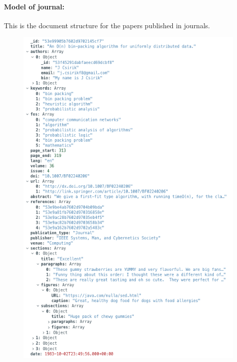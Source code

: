 \paragraph{Model of journal:}
This is the document structure for the papers published in journals.
\begin{figure}[H]
    \begin{center}
        \includegraphics[width=0.9\linewidth]{ImagesMongoDB/journal}
        \label{fig:journal}%
    \end{center}
\end{figure}

